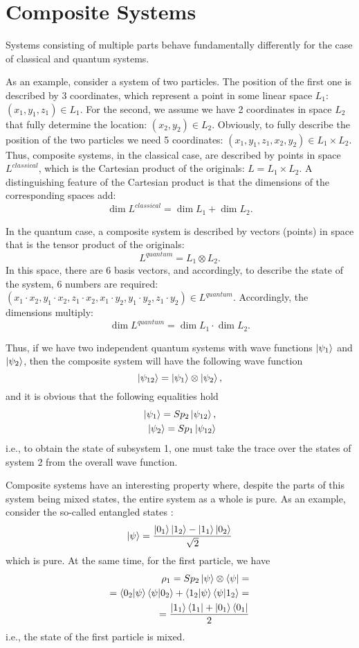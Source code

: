 \section{Composite Systems}
\label{sec:add:quantum:composite}
Systems consisting of multiple parts behave fundamentally differently for the case of classical and quantum systems.

As an example, consider a system of two particles. The position of the first one is described by 3 coordinates, which represent a point in some linear space $L_1$: $(x_1, y_1, z_1) \in L_1$. For the second, we assume we have 2 coordinates in space $L_2$ that fully determine the location: $(x_2, y_2) \in L_2$. Obviously, to fully describe the position of the two particles we need 5 coordinates: $(x_1, y_1, z_1, x_2, y_2) \in L_1 \times L_2$. Thus, composite systems, in the classical case, are described by points in space $L^{classical}$, which is the Cartesian product of the originals: $L = L_1 \times L_2$. A distinguishing feature of the Cartesian product is that the dimensions of the corresponding spaces add:
\[
\dim{L^{classical}} = \dim{L_1} + \dim{L_2}.
\]

In the quantum case, a composite system is described by vectors (points) in space that is the tensor product of the originals:
\[
L^{quantum} = L_1 \otimes L_2.
\]
In this space, there are 6 basis vectors, and accordingly, to describe the state of the system, 6 numbers are required: $(x_1 \cdot x_2, y_1 \cdot x_2, z_1 \cdot x_2, x_1 \cdot y_2, y_1 \cdot y_2, z_1 \cdot y_2) \in L^{quantum}$. Accordingly, the dimensions multiply:
\[
\dim{L^{quantum}} = \dim{L_1} \cdot \dim{L_2}.
\]

Thus, if we have two independent quantum systems with wave functions $\ket{\psi_1}$ and $\ket{\psi_2}$, then the composite system will have the following wave function
\[
\ket{\psi_{12}} = \ket{\psi_1} \otimes \ket{\psi_2},
\]
and it is obvious that the following equalities hold
\begin{eqnarray}
\ket{\psi_1} = Sp_2 \ket{\psi_{12}}, \\
\nonumber
\ket{\psi_2} = Sp_1 \ket{\psi_{12}}
\nonumber
\end{eqnarray}
i.e., to obtain the state of subsystem 1, one must take the trace over the states of system 2 from the overall wave function.

Composite systems have an interesting property where, despite the parts of this system being mixed states, the entire system as a whole is pure. As an example, consider the so-called entangled states :
\[
\ket{\psi} = \frac{\ket{0_1}\ket{1_2} - \ket{1_1}\ket{0_2}}{\sqrt{2}}
\]
which is pure. At the same time, for the first particle, we have
\begin{eqnarray}
\rho_1 = Sp_2 \ket{\psi} \otimes \bra{\psi} =
\nonumber \\
=
\bra{0_2}\ket{\psi}\bra{\psi}\ket{0_2} +
\bra{1_2}\ket{\psi}\bra{\psi}\ket{1_2} =
\nonumber \\
= \frac{\ket{1_1}\bra{1_1} +
\ket{0_1}\bra{0_1}}{2}
\nonumber
\end{eqnarray}
i.e., the state of the first particle is mixed.